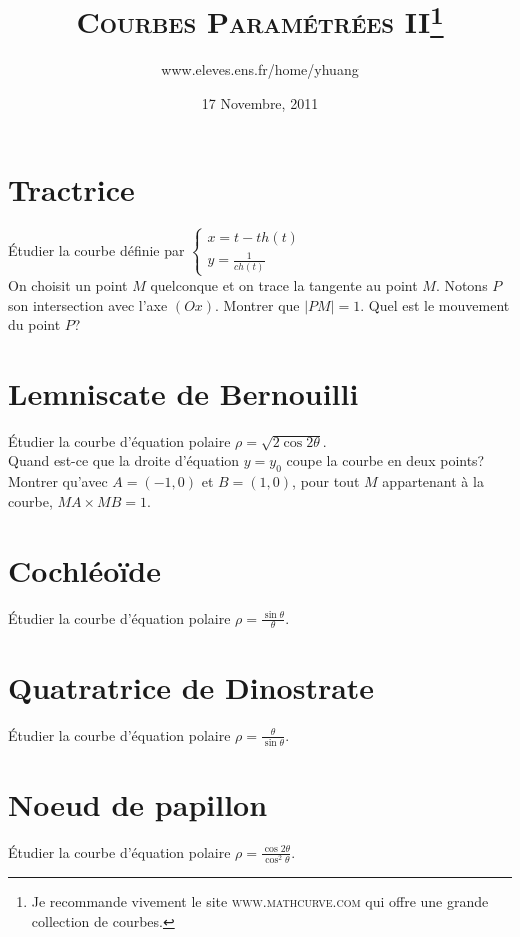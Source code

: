 \documentclass{article}
\begin{document}
\title{\textsc{Courbes Param\'etr\'ees II}\footnote{Je recommande vivement le site \textsc{www.mathcurve.com} qui offre une grande collection de courbes.}}
\author{www.eleves.ens.fr/home/yhuang}
\date{17 Novembre, 2011}

\maketitle

\section{Tractrice}
\'Etudier la courbe d\'efinie par $\left\{\begin{array}{l}  x=t-th(t) \\ y=\frac{1}{ch(t)} \end{array}\right.$\\
On choisit un point $M$ quelconque et on trace la tangente au point $M$. Notons $P$ son intersection avec l'axe $(Ox)$. Montrer que $|PM|=1$. Quel est le mouvement du point $P$?

\section{Lemniscate de Bernouilli}
\'Etudier la courbe d'\'equation polaire $\rho=\sqrt{2\cos2\theta}$.\\
Quand est-ce que la droite d'\'equation $y=y_0$ coupe la courbe en deux points?\\
Montrer qu'avec $A=(-1,0)$ et $B=(1,0)$, pour tout $M$ appartenant \`a la courbe, $MA\times MB=1$.

\section{Cochl\'eo\"ide}
\'Etudier la courbe d'\'equation polaire $\rho=\frac{\sin\theta}{\theta}$.

\section{Quatratrice de Dinostrate}
\'Etudier la courbe d'\'equation polaire $\rho=\frac{\theta}{\sin\theta}$.

\section{Noeud de papillon}
\'Etudier la courbe d'\'equation polaire $\rho=\frac{\cos2\theta}{\cos^2\theta}$.
\end{document}
